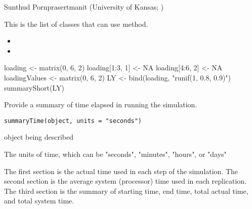 \documentclass[a4paper]{book}
\begin{document}
%
\begin{Author}\relax
Sunthud Pornprasertmanit (University of Kansas; )
\end{Author}
%
\begin{SeeAlso}\relax
This is the list of classes that can use  method.
\begin{itemize}

\item {}
\item {}

\end{itemize}

\end{SeeAlso}
%
\begin{Examples}
\begin{ExampleCode}
loading <- matrix(0, 6, 2)
loading[1:3, 1] <- NA
loading[4:6, 2] <- NA
loadingValues <- matrix(0, 6, 2)
LY <- bind(loading, "runif(1, 0.8, 0.9)")
summaryShort(LY)
\end{ExampleCode}
\end{Examples}
%
\begin{Description}\relax
Provide a summary of time elapsed in running the simulation.
\end{Description}
%
\begin{Usage}
\begin{verbatim}
summaryTime(object, units = "seconds")
\end{verbatim}
\end{Usage}
%
\begin{Arguments}
\begin{ldescription}
\item[\code{object}] 
 object being described

\item[\code{units}] 
The units of time, which can be "seconds", "minutes", "hours", or "days"

\end{ldescription}
\end{Arguments}
%
\begin{Value}
The first section is the actual time used in each step of the simulation. The second section is the average system (processor) time used in each replication. The third section is the summary of starting time, end time, total actual time, and total system time.
\end{Value}
\end{document}
